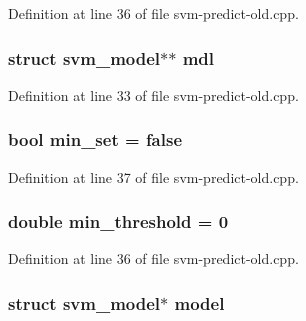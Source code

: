 Definition at line 36 of file svm-\/predict-\/old.\-cpp.

\hypertarget{svm-predict-old_8cpp_a639aa8f86cbf6b9c5d43e0c5082e26ac}{
\subsubsection[{mdl}]{\setlength{\rightskip}{0pt plus 5cm}struct {\bf svm\-\_\-model}$\ast$$\ast$ mdl}}\label{svm-predict-old_8cpp_a639aa8f86cbf6b9c5d43e0c5082e26ac}


Definition at line 33 of file svm-\/predict-\/old.\-cpp.

\hypertarget{svm-predict-old_8cpp_aa816fb83dd1b415e1339bb8ddd6cdabc}{
\subsubsection[{min\-\_\-set}]{\setlength{\rightskip}{0pt plus 5cm}bool min\-\_\-set = false}}\label{svm-predict-old_8cpp_aa816fb83dd1b415e1339bb8ddd6cdabc}


Definition at line 37 of file svm-\/predict-\/old.\-cpp.

\hypertarget{svm-predict-old_8cpp_a3670388207cf8d0f4f4c9237a1482057}{
\subsubsection[{min\-\_\-threshold}]{\setlength{\rightskip}{0pt plus 5cm}double min\-\_\-threshold = 0}}\label{svm-predict-old_8cpp_a3670388207cf8d0f4f4c9237a1482057}


Definition at line 36 of file svm-\/predict-\/old.\-cpp.

\hypertarget{svm-predict-old_8cpp_a50c87b127b14787341e9630f4f5c700a}{
\subsubsection[{model}]{\setlength{\rightskip}{0pt plus 5cm}struct {\bf svm\-\_\-model}$\ast$ model}}\label{svm-predict-old_8cpp_a50c87b127b14787341e9630f4f5c700a}



